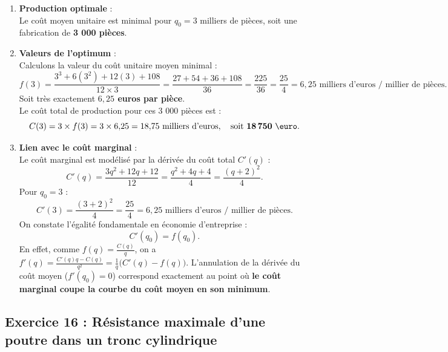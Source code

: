 \documentclass[11pt,a4paper]{article}
\begin{document}
\begin{correctionbox}
\begin{enumerate}[label=\textbf{\arabic*.}]
    \item \textbf{Production optimale} :\\
    Le coût moyen unitaire est minimal pour $q_0 = 3$ milliers de pièces, soit une fabrication de \textbf{3 000 pièces}.

    \item \textbf{Valeurs de l'optimum} :\\
    Calculons la valeur du coût unitaire moyen minimal :
    \[
    f(3) = \frac{3^3 + 6(3^2) + 12(3) + 108}{12 \times 3} = \frac{27 + 54 + 36 + 108}{36} = \frac{225}{36} = \frac{25}{4} = 6{,}25 \text{ milliers d'euros / millier de pièces}.
    \]
    Soit très exactement \textbf{$6{,}25$ euros par pièce}.\\
    Le coût total de production pour ces 3 000 pièces est :
    \[
    C(3) = 3 \times f(3) = 3 \times 6{,}25 = 18{,}75 \text{ milliers d'euros}, \quad \text{soit } \mathbf{18\,750\text{ \euro}}.
    \]

    \item \textbf{Lien avec le coût marginal} :\\
    Le coût marginal est modélisé par la dérivée du coût total $C'(q)$ :
    \[
    C'(q) = \frac{3q^2 + 12q + 12}{12} = \frac{q^2 + 4q + 4}{4} = \frac{(q+2)^2}{4}.
    \]
    Pour $q_0 = 3$ :
    \[
    C'(3) = \frac{(3+2)^2}{4} = \frac{25}{4} = 6{,}25 \text{ milliers d'euros / millier de pièces}.
    \]
    On constate l'égalité fondamentale en économie d'entreprise :
    \[
    C'(q_0) = f(q_0).
    \]
    En effet, comme $f(q) = \frac{C(q)}{q}$, on a $f'(q) = \frac{C'(q)q - C(q)}{q^2} = \frac{1}{q}\big(C'(q) - f(q)\big)$.
    L'annulation de la dérivée du coût moyen ($f'(q_0) = 0$) correspond exactement au point où \textbf{le coût marginal coupe la courbe du coût moyen en son minimum}.
\end{enumerate}
\end{correctionbox}

\subsection*{Exercice 16 : Résistance maximale d'une poutre dans un tronc cylindrique}
\end{document}
